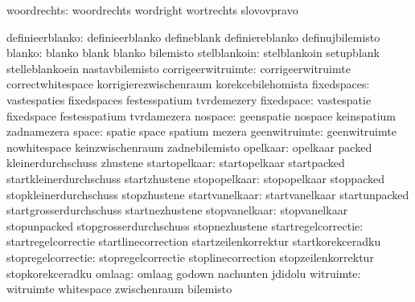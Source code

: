                   woordrechts:  woordrechts                  wordright
                                wortrechts                   slovovpravo

              definieerblanko:  definieerblanko              defineblank
                                definiereblanko              definujbilemisto
                       blanko:  blanko                       blank
                                blanko                       bilemisto
                 stelblankoin:  stelblankoin                 setupblank
                                stelleblankoein              nastavbilemisto
           corrigeerwitruimte:  corrigeerwitruimte           correctwhitespace
                                korrigierezwischenraum       korekcebilehomista
                  fixedspaces:  vastespaties                 fixedspaces
                                festesspatium                tvrdemezery
                   fixedspace:  vastespatie                  fixedspace
                                festesspatium                tvrdamezera
                      nospace:  geenspatie                   nospace
                                keinspatium                  zadnamezera
                        space:  spatie                       space
                                spatium                      mezera
                geenwitruimte:  geenwitruimte                nowhitespace
                                keinzwischenraum             zadnebilemisto
                     opelkaar:  opelkaar                     packed
                                kleinerdurchschuss           zhustene
                startopelkaar:  startopelkaar                startpacked
                                startkleinerdurchschuss      startzhustene
                 stopopelkaar:  stopopelkaar                 stoppacked
                                stopkleinerdurchschuss       stopzhustene
               startvanelkaar:  startvanelkaar               startunpacked
                                startgrosserdurchschuss      startnezhustene
                stopvanelkaar:  stopvanelkaar                stopunpacked
                                stopgrosserdurchschuss       stopnezhustene
          startregelcorrectie:  startregelcorrectie          startlinecorrection
                                startzeilenkorrektur         startkorekceradku
           stopregelcorrectie:  stopregelcorrectie           stoplinecorrection
                                stopzeilenkorrektur          stopkorekceradku
                       omlaag:  omlaag                       godown
                                nachunten                    jdidolu
                    witruimte:  witruimte                    whitespace
                                zwischenraum                 bilemisto

